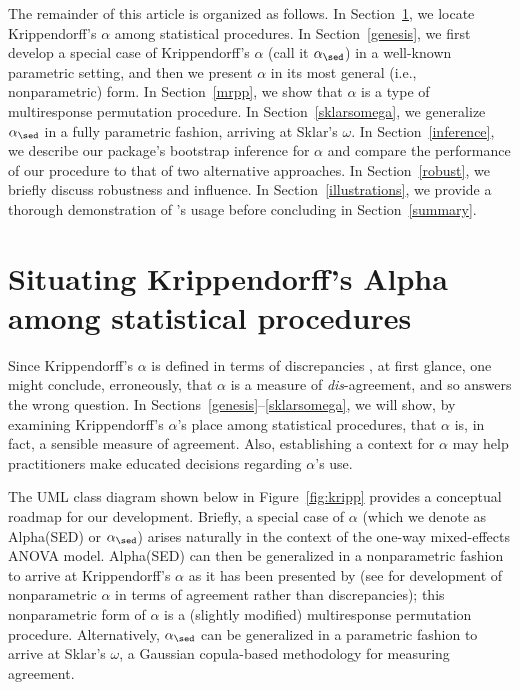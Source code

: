 The remainder of this article is organized as follows. In Section~\ref{situate}, we locate Krippendorff's $\alpha$ among statistical procedures. In Section~\ref{genesis}, we first develop a special case of Krippendorff's $\alpha$ (call it $\alpha_\sed$) in a well-known parametric setting, and then we present $\alpha$ in its most general (i.e., nonparametric) form. In Section~\ref{mrpp}, we show that $\alpha$ is a type of multiresponse permutation procedure. In Section~\ref{sklarsomega}, we generalize $\alpha_\sed$ in a fully parametric fashion, arriving at Sklar's $\omega$. In Section~\ref{inference}, we describe our package's bootstrap inference for $\alpha$ and compare the performance of our procedure to that of two alternative approaches. In Section~\ref{robust}, we briefly discuss robustness and influence. In Section~\ref{illustrations}, we provide a thorough demonstration of 's usage before concluding in Section~\ref{summary}.

\section{Situating Krippendorff's Alpha among statistical procedures}
\label{situate}

Since Krippendorff's $\alpha$ is defined in terms of discrepancies \citep{krippendorff2013}, at first glance, one might conclude, erroneously, that $\alpha$ is a measure of {\em dis}-agreement, and so answers the wrong question. In Sections~\ref{genesis}--\ref{sklarsomega}, we will show, by examining Krippendorff's $\alpha$'s place among statistical procedures, that $\alpha$ is, in fact, a sensible measure of agreement. Also, establishing a context for $\alpha$ may help practitioners make educated decisions regarding $\alpha$'s use.

The UML class diagram \citep{fowler2004uml} shown below in Figure~\ref{fig:kripp} provides a conceptual roadmap for our development. Briefly, a special case of $\alpha$ (which we denote as Alpha(SED) or $\alpha_\sed$) arises naturally in the context of the one-way mixed-effects ANOVA model. Alpha(SED) can then be generalized in a nonparametric fashion to arrive at Krippendorff's $\alpha$ as it has been presented by \citeauthor{hayes2007answering} (see \citet{gwet2015} for development of nonparametric $\alpha$ in terms of agreement rather than discrepancies); this nonparametric form of $\alpha$ is a (slightly modified) multiresponse permutation procedure. Alternatively, $\alpha_\sed$ can be generalized in a parametric fashion to arrive at Sklar's $\omega$, a Gaussian copula-based methodology for measuring agreement.

